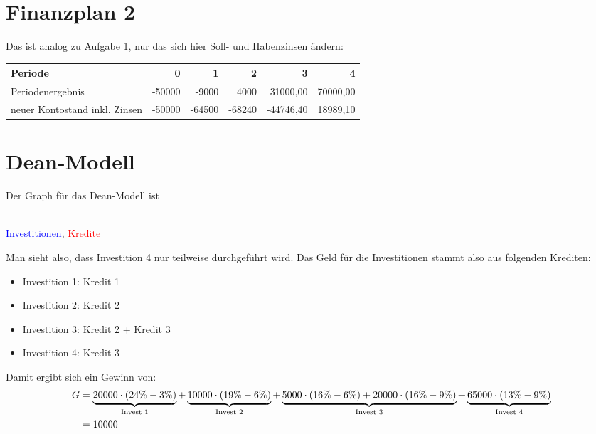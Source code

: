 \documentclass{article}
\begin{document}
	\section*{Finanzplan 2}
	Das ist analog zu Aufgabe 1, nur das sich hier Soll- und Habenzinsen ändern:
	\begin{center}
		\begin{tabular}{l|r|r|r|r|r}
			Periode & 0 & 1 & 2 & 3 & 4 \\
			\hline
			Periodenergebnis & -50000 & -9000 & 4000 & 31000,00 & 70000,00 \\
			\hline
			neuer Kontostand inkl. Zinsen & -50000 & -64500 & -68240 & -44746,40 & 18989,10
		\end{tabular}
	\end{center}
	
	\section*{Dean-Modell}
	Der Graph für das Dean-Modell ist
	\begin{center}
		 \\
		\textcolor{blue}{Investitionen}, \textcolor{red}{Kredite}
	\end{center}
	Man sieht also, dass Investition 4 nur teilweise durchgeführt wird. Das Geld für die Investitionen stammt also aus folgenden Krediten:
	\begin{itemize}
		\item Investition 1: Kredit 1
		\item Investition 2: Kredit 2
		\item Investition 3: Kredit 2 + Kredit 3
		\item Investition 4: Kredit 3
	\end{itemize}
	Damit ergibt sich ein Gewinn von:
	\begin{align}
		G &= \underbrace{20000\cdot (24\%-3\%)}_{\text{Invest 1}} + \underbrace{10000\cdot (19\%-6\%)}_{\text{Invest 2}} + \underbrace{5000\cdot (16\%-6\%) + 20000\cdot (16\%-9\%)}_{\text{Invest 3}} + \underbrace{65000\cdot (13\%-9\%)}_{\text{Invest 4}} \notag \\
		&= 10000 \notag
	\end{align}
	
\end{document}
